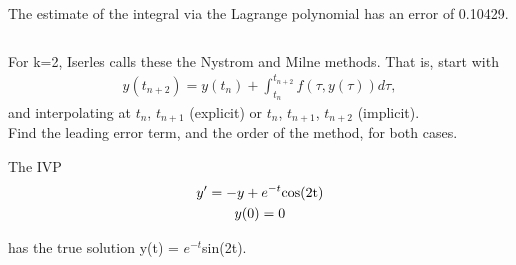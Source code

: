 \documentclass{jhwhw}
\begin{document}
    \raggedright
    The estimate of the integral via the Lagrange polynomial has an error of 0.10429.

    {\centering \inputminted[linenos,breaklines,bgcolor=llgray,frame=lines,framesep=2mm]{octave}{p2.m}}

\problem{}

    For k=2, Iserles calls these the Nystrom and Milne methods. That is, start with
    \begin{gather}
	    y(t_{n+2}) = y(t_n) + \int_{t_n}^{t_{n+2}}f(\tau , y(\tau )) d\tau ,
    \end{gather}
    and interpolating at $t_n$, $t_{n+1}$ (explicit) or $t_n$, $t_{n+1}$, $t_{n+2}$ (implicit). \\
    Find the leading error term, and the order of the method, for both cases.

\solution

\problem{}

The IVP \\
\begin{gather}
    y' = -y + e^{-t}$cos(2t)$\\
    y(0) = 0
\end{gather}

has the true solution y(t) = $e^{-t}$sin(2t).

\solution
\end{document}
